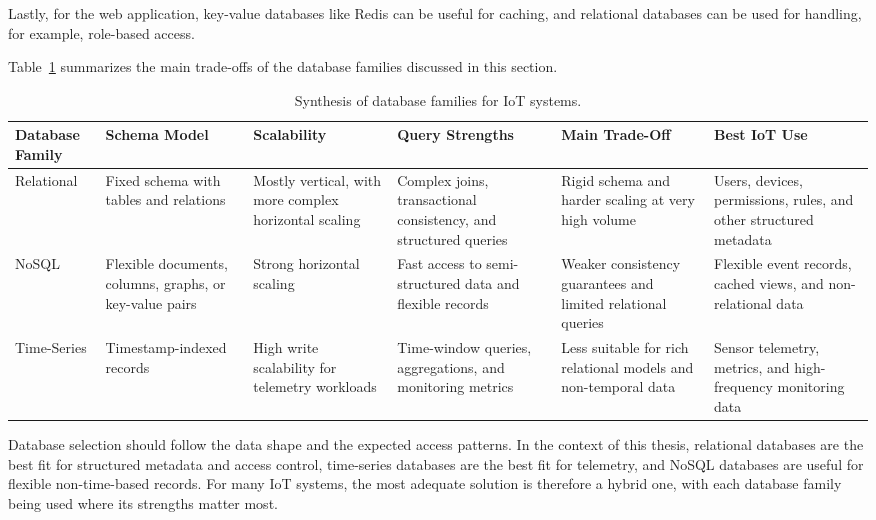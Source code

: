 Lastly, for the web application, key-value databases like Redis can be useful
for caching, and relational databases can be used for handling, for example,
role-based access.

Table~\ref{tab:database-synthesis} summarizes the main trade-offs of the
database families discussed in this section.

\begin{table}[htbp]
	\centering
	\caption{Synthesis of database families for \gls{IoT} systems.}
	\label{tab:database-synthesis}
	\renewcommand{\arraystretch}{1.15}
	\footnotesize
	\begin{tabularx}{\textwidth}{>{\raggedright\arraybackslash}p{2.1cm} >{\raggedright\arraybackslash}p{2cm} >{\raggedright\arraybackslash}p{1.9cm} >{\raggedright\arraybackslash}X >{\raggedright\arraybackslash}p{2.4cm} >{\raggedright\arraybackslash}p{2.4cm}}
		\toprule
		\textbf{Database Family} & \textbf{Schema Model} & \textbf{Scalability} & \textbf{Query Strengths} & \textbf{Main Trade-Off} & \textbf{Best IoT Use} \\
		\midrule
		Relational & Fixed schema with tables and relations & Mostly vertical, with more complex horizontal scaling & Complex joins, transactional consistency, and structured queries & Rigid schema and harder scaling at very high volume & Users, devices, permissions, rules, and other structured metadata \\
		NoSQL & Flexible documents, columns, graphs, or key-value pairs & Strong horizontal scaling & Fast access to semi-structured data and flexible records & Weaker consistency guarantees and limited relational queries & Flexible event records, cached views, and non-relational data \\
		Time-Series & Timestamp-indexed records & High write scalability for telemetry workloads & Time-window queries, aggregations, and monitoring metrics & Less suitable for rich relational models and non-temporal data & Sensor telemetry, metrics, and high-frequency monitoring data \\
		\bottomrule
	\end{tabularx}
\end{table}

Database selection should follow the data shape and the expected access
patterns. In the context of this thesis, relational databases are the best fit
for structured metadata and access control, time-series databases are the best
fit for telemetry, and \gls{NoSQL} databases are useful for flexible
non-time-based records. For many \gls{IoT} systems, the most adequate solution
is therefore a hybrid one, with each database family being used where its
strengths matter most.

